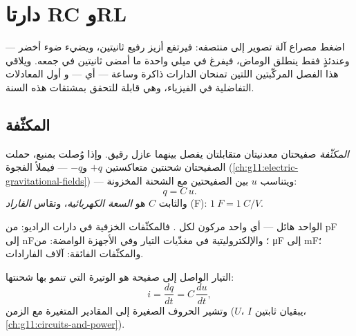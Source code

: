 \chapter{دارتا RC وRL}\label{ch:g12:rc-rl-circuits}

اضغط مصراع آلة تصوير إلى منتصفه: فيرتفع أزيز رفيع ثانيتين، ويضيء
ضوء أخضر --- وعندئذٍ فقط ينطلق الوماض، فيفرغ في ميلي  واحدة
ما أمضى ثانيتين في جمعه. ويلاقي هذا الفصل المركّبتين
اللتين تمنحان الدارات ذاكرة وساعة --- أي   --- و
أول المعادلات التفاضلية في الفيزياء، وهي قابلة للتحقق بمشتقات هذه السنة.

\section{المكثّفة}

\begin{definition}\label{def:g12:rc-rl-circuits:capacitor}
\emph{المكثّفة} صفيحتان معدنيتان متقابلتان
يفصل بينهما عازل رقيق. وإذا وُصلت بمنبع، حملت الصفيحتان
شحنتين متعاكستين $+q$ و$-q$ --- فيملأ  الفجوة
(\cref{ch:g11:electric-gravitational-fields}) --- ويتناسب  $u$
بين الصفيحتين مع الشحنة المخزونة:
\[ q = C\,u . \]
والثابت $C$ هو \emph{السعة الكهربائية}، وتقاس
 \emph{الفاراد} (\unit{F}): $\qty{1}{F} = \qty{1}{C/V}$.
\end{definition}

\begin{example}\label{ex:g12:rc-rl-circuits:orders}
 الواحد هائل --- أي  واحد مركون لكل . فالمكثّفات الخزفية في دارات
الراديو: من \unit{pF} إلى \unit{nF}؛ والإلكتروليتية في مغذّيات التيار
وفي الأجهزة الوامضة: من \unit{\micro F} إلى \unit{mF}؛ والمكثّفات الفائقة: آلاف الفارادات.
\end{example}

\begin{proposition}\label{prop:g12:rc-rl-circuits:cdudt}
التيار الواصل إلى صفيحة  هو الوتيرة التي تنمو بها
شحنتها:
\[
i = \frac{dq}{dt} = C\,\frac{du}{dt} ,
\]
وتشير الحروف الصغيرة إلى المقادير المتغيرة مع الزمن ($U$، $I$ يبقيان ثابتين،
\cref{ch:g11:circuits-and-power}).
\end{proposition}

